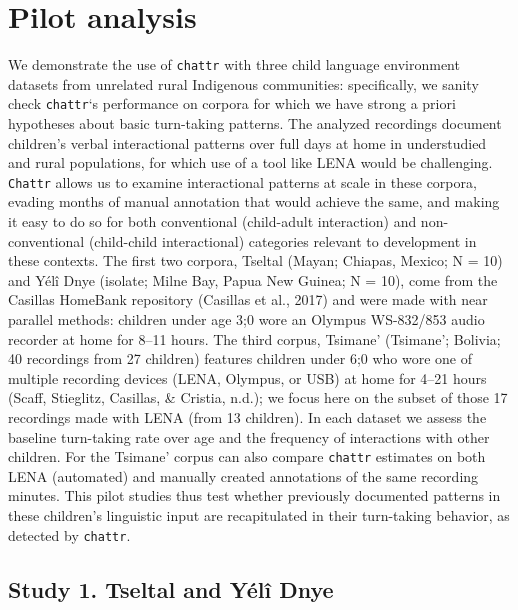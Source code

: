 \documentclass[10pt, letterpaper]{article}
\begin{document}
\hypertarget{pilot-analysis}{%
\section{Pilot analysis}\label{pilot-analysis}}

We demonstrate the use of \texttt{chattr} with three child language
environment datasets from unrelated rural Indigenous communities:
specifically, we sanity check \texttt{chattr}`s performance on corpora
for which we have strong a priori hypotheses about basic turn-taking
patterns. The analyzed recordings document children's verbal
interactional patterns over full days at home in understudied and rural
populations, for which use of a tool like LENA would be challenging.
\texttt{Chattr} allows us to examine interactional patterns at scale in
these corpora, evading months of manual annotation that would achieve
the same, and making it easy to do so for both conventional (child-adult
interaction) and non-conventional (child-child interactional) categories
relevant to development in these contexts. The first two corpora,
Tseltal (Mayan; Chiapas, Mexico; N = 10) and Yélî Dnye (isolate; Milne
Bay, Papua New Guinea; N = 10), come from the Casillas HomeBank
repository (Casillas et al., 2017) and were made with near parallel
methods: children under age 3;0 wore an Olympus WS-832/853 audio
recorder at home for 8--11 hours. The third corpus, Tsimane' (Tsimane';
Bolivia; 40 recordings from 27 children) features children under 6;0 who
wore one of multiple recording devices (LENA, Olympus, or USB) at home
for 4--21 hours (Scaff, Stieglitz, Casillas, \& Cristia, n.d.); we focus
here on the subset of those 17 recordings made with LENA (from 13
children). In each dataset we assess the baseline turn-taking rate over
age and the frequency of interactions with other children. For the
Tsimane' corpus can also compare \texttt{chattr} estimates on both LENA
(automated) and manually created annotations of the same recording
minutes. This pilot studies thus test whether previously documented
patterns in these children's linguistic input are recapitulated in their
turn-taking behavior, as detected by \texttt{chattr}.

\hypertarget{study-1.-tseltal-and-yuxe9luxee-dnye}{%
\subsection{Study 1. Tseltal and Yélî
Dnye}\label{study-1.-tseltal-and-yuxe9luxee-dnye}}
\end{document}
